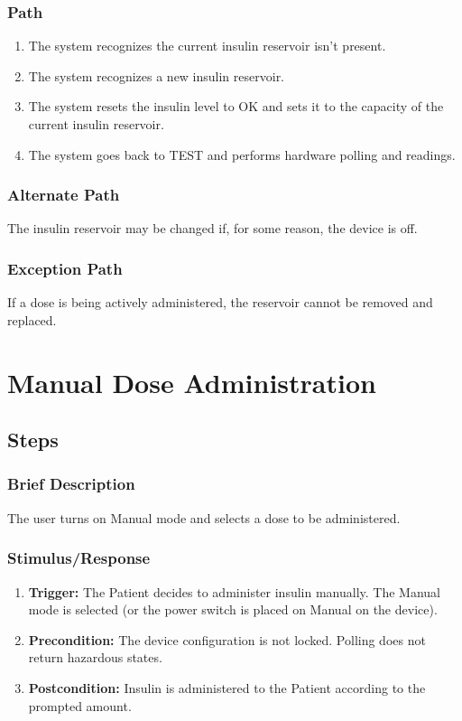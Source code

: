 \documentclass{scrreprt}
\begin{document}
    \subsubsection{Path}
    \begin{enumerate}
        \item The system recognizes the current insulin reservoir isn't present.
        \item The system recognizes a new insulin reservoir.
        \item The system resets the insulin level to OK and sets it to the capacity of the current insulin reservoir.
        \item The system goes back to TEST and performs hardware polling and readings.
    \end{enumerate}
    \subsubsection{Alternate Path}
        The insulin reservoir may be changed if, for some reason, the device is off.
    \subsubsection{Exception Path}
        If a dose is being actively administered, the reservoir cannot be removed and replaced.

\section{Manual Dose Administration}
\subsection{Steps}
    \subsubsection{Brief Description}
        The user turns on Manual mode and selects a dose to be administered.
    \subsubsection{Stimulus/Response}
    \begin{enumerate}
        \item \textbf{Trigger:} The Patient decides to administer insulin manually. The Manual mode is selected (or the power switch is placed on Manual on the device).
        \item \textbf{Precondition:} The device configuration is not locked. Polling does not return hazardous states. 
        \item \textbf{Postcondition:} Insulin is administered to the Patient according to the prompted amount.
    \end{enumerate}
\end{document}
